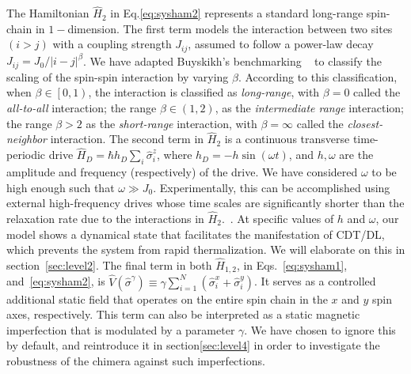 \documentclass[12pt]{iopart}
\begin{document}
The Hamiltonian $\hat{H}_2$ in Eq.\eqref{eq:sysham2} represents a standard long-range spin-chain in $1-$dimension. The first term models the interaction between two sites $(i>j)$ with a coupling strength $J_{ij}$, assumed to follow a power-law decay $J_{ij}={J_0}/{|i-j|^\beta}$. We have adapted Buyskikh's benchmarking ~\cite{buyskikh_entanglement_2016} to classify the scaling of the spin-spin interaction by varying $\beta$. According to this classification, when $\beta\in\left[0,1\right)$, the interaction is classified as \textit{long-range}, with $\beta=0$ called the \textit{all-to-all} interaction; the range $\beta\in \left(1,2\right)$, as the \textit{ intermediate range} interaction; the range $\beta > 2$ as the \textit{ short-range} interaction, with $\beta= \infty$ called the \textit{ closest-neighbor} interaction. The second term in $\hat{H}_2$ is a continuous transverse time-periodic drive $\displaystyle \hat{H}_D=\hbar h_D \sum_i\hat{\sigma}^z_i$, where $\displaystyle h_D = -h\sin{(\omega t)}$, and $h,\omega$ are the amplitude and frequency (respectively) of the drive. We have considered $\omega$ to be high enough such that $\omega\gg J_0$. 	Experimentally, this can be accomplished using external high-frequency drives whose time scales are significantly shorter than the relaxation rate due to the interactions in $\hat{H}_2$.~\cite{choi_observation_2017,zhang_observation_2017,Cirac_1995,Blatt_2012}. At specific values of $h$ and $\omega$, our model shows a dynamical state that facilitates the manifestation of CDT/DL, which prevents the system from rapid thermalization. We will elaborate on this in section~\ref{sec:level2}. The final term in both $\hat{H}_{1,2}$, in Eqs.~\eqref{eq:sysham1}, and~\eqref{eq:sysham2}, is $\displaystyle \hat{V}(\hat{\sigma}^{\gamma}) \equiv\gamma  \sum_{i=1}^{N} (\hat{\sigma}^x_i + \hat{\sigma}^y_i)$. It serves as a controlled additional static field that operates on the entire spin chain in the $x$ and $y$ spin axes, respectively.  This term can also be interpreted as a static magnetic imperfection that is modulated by a parameter $\gamma$. We have chosen to ignore this by default, and reintroduce it in section\ref{sec:level4} in order to investigate the robustness of the chimera against such imperfections.
\end{document}
